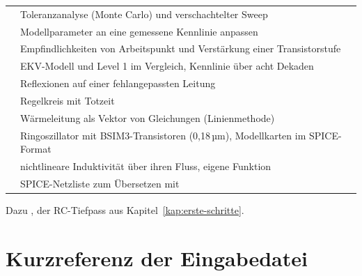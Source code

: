 \begin{longtable}{@{}P{5.5cm}P{8.5cm}@{}}
   & Toleranzanalyse (Monte Carlo) und verschachtelter Sweep \\
   & Modellparameter an eine gemessene Kennlinie anpassen \\
   & Empfindlichkeiten von Arbeitspunkt und Verstärkung einer Transistorstufe \\
   & EKV-Modell und Level 1 im Vergleich, Kennlinie über acht Dekaden \\
   & Reflexionen auf einer fehlangepassten Leitung \\
   & Regelkreis mit Totzeit \\
   & Wärmeleitung als Vektor von Gleichungen (Linienmethode) \\
   & Ringoszillator mit BSIM3-Transistoren (0,18\,µm), Modellkarten im SPICE-Format \\
   & nichtlineare Induktivität über ihren Fluss, eigene Funktion \\
   & SPICE-Netzliste zum Übersetzen mit  \\
\end{longtable}

Dazu , der RC-Tiefpass aus
Kapitel~\ref{kap:erste-schritte}.

\chapter{Kurzreferenz der Eingabedatei}

